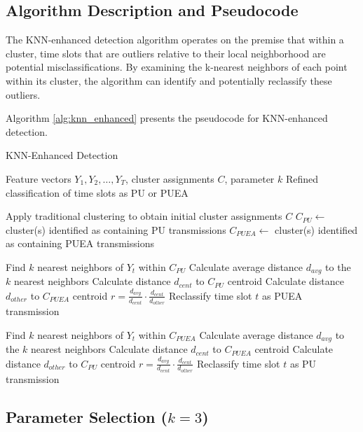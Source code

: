 \subsection{Algorithm Description and Pseudocode}

The KNN-enhanced detection algorithm operates on the premise that within a cluster, time slots that are outliers relative to their local neighborhood are potential misclassifications. By examining the k-nearest neighbors of each point within its cluster, the algorithm can identify and potentially reclassify these outliers.

Algorithm \ref{alg:knn_enhanced} presents the pseudocode for KNN-enhanced detection.

\begin{algorithm}
\caption{KNN-Enhanced Detection}
\label{alg:knn_enhanced}
\begin{algorithmic}[1]
\Require Feature vectors $Y_1, Y_2, \ldots, Y_T$, cluster assignments $C$, parameter $k$
\Ensure Refined classification of time slots as PU or PUEA

\State Apply traditional clustering to obtain initial cluster assignments $C$
\State $C_{PU} \gets$ cluster(s) identified as containing PU transmissions
\State $C_{PUEA} \gets$ cluster(s) identified as containing PUEA transmissions

    \State Find $k$ nearest neighbors of $Y_t$ within $C_{PU}$
    \State Calculate average distance $d_{avg}$ to the $k$ nearest neighbors
    \State Calculate distance $d_{cent}$ to $C_{PU}$ centroid
    \State Calculate distance $d_{other}$ to $C_{PUEA}$ centroid
    \State $r = \frac{d_{avg}}{d_{cent}} \cdot \frac{d_{cent}}{d_{other}}$
        \State Reclassify time slot $t$ as PUEA transmission
    \EndIf
\EndFor

    \State Find $k$ nearest neighbors of $Y_t$ within $C_{PUEA}$
    \State Calculate average distance $d_{avg}$ to the $k$ nearest neighbors
    \State Calculate distance $d_{cent}$ to $C_{PUEA}$ centroid
    \State Calculate distance $d_{other}$ to $C_{PU}$ centroid
    \State $r = \frac{d_{avg}}{d_{cent}} \cdot \frac{d_{cent}}{d_{other}}$
        \State Reclassify time slot $t$ as PU transmission
    \EndIf
\EndFor

\end{algorithmic}
\end{algorithm}

\subsection{Parameter Selection ($k=3$)}

